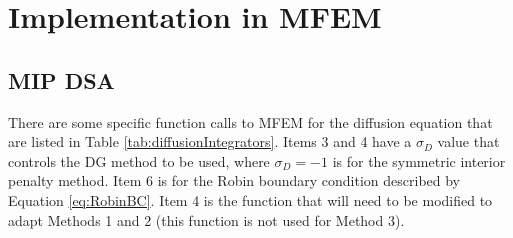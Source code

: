 \documentclass{article}
\begin{document}
\section{Implementation in MFEM}

\subsection{MIP DSA}

There are some specific function calls to MFEM for the diffusion equation that are listed in Table \ref{tab:diffusionIntegrators}. Items 3 and 4 have a $\sigma_D$ value that controls the DG method to be used, where $\sigma_D = -1$ is for the symmetric interior penalty method. Item 6 is for the Robin boundary condition described by Equation \ref{eq:RobinBC}. Item 4 is the function that will need to be modified to adapt Methods 1 and 2 (this function is not used for Method 3).
\end{document}
